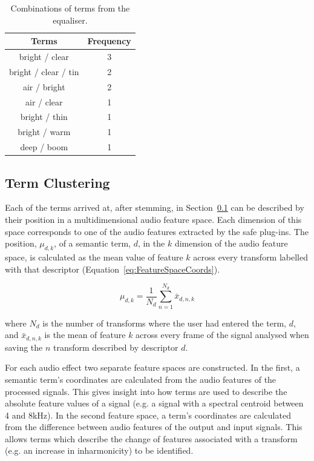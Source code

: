 		\begin{table}[h!]
			\centering
			\begin{tabular}{|c|c|}
				\hline
				\bf{Terms} & \bf{Frequency} \tabularnewline
				\hline
				\hline
				bright / clear & 3 \tabularnewline
				\hline
				bright / clear / tin & 2 \tabularnewline
				\hline
				air / bright & 2 \tabularnewline
				\hline
				air / clear & 1 \tabularnewline
				\hline
				bright / thin & 1 \tabularnewline
				\hline
				bright / warm & 1 \tabularnewline
				\hline
				deep / boom & 1 \tabularnewline
				\hline
			\end{tabular}
			\caption{Combinations of terms from the equaliser.}
			\label{tab:EqualiserTermCombinations}
		\end{table}
		
	\subsection{Term Clustering}
	\label{sec:TimbreEvaluation-Analysis-TermClustering}
		Each of the terms arrived at, after stemming, in Section~\ref{sec:TimbreEvaluation-Analysis-TermClustering}
		can be described by their position in a multidimensional audio feature space. Each dimension of this space
		corresponds to one of the audio features extracted by the \acrshort{safe} plug-ins. The position,
		$\mu_{d,k}$, of a semantic term, $d$, in the $k$ dimension of the audio feature space, is
		calculated as the mean value of feature $k$ across every transform labelled with that descriptor
		(Equation~\ref{eq:FeatureSpaceCoords}).

		\begin{equation}
			\mu_{d,k} = \frac{1}{N_{d}} \sum_{n = 1}^{N_{d}} \bar{x}_{d,n,k}
			\label{eq:FeatureSpaceCoords}
		\end{equation}

		where $N_{d}$ is the number of transforms where the user had entered the term, $d$, and $\bar{x}_{d,n,k}$
		is the mean of feature $k$ across every frame of the signal analysed when saving the $n$
		transform described by descriptor $d$.
		
		For each audio effect two separate feature spaces are constructed. In the first, a semantic term's
		coordinates are calculated from the audio features of the processed signals. This gives insight into how
		terms are used to describe the absolute feature values of a signal (e.g. a signal with a spectral centroid
		between 4 and 8kHz). In the second feature space, a term's coordinates are calculated from the difference
		between audio features of the output and input signals. This allows terms which describe the change of
		features associated with a transform (e.g. an increase in inharmonicity) to be identified.

